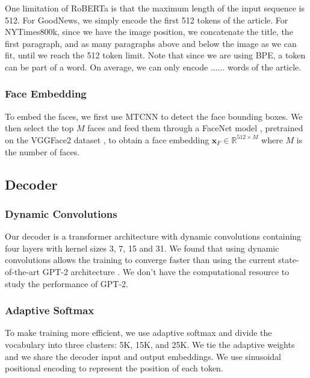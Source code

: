 \documentclass[10pt,twocolumn,letterpaper]{article}
\begin{document}
One limitation of RoBERTa is that the maximum length of the input sequence is
512. For GoodNews, we simply encode the first 512 tokens of the article. For
NYTimes800k, since we have the image position, we concatenate the title, the
first paragraph, and as many paragraphs above and below the image as we can
fit, until we reach the 512 token limit. Note that since we are using BPE, a
token can be part of a word. On average, we can only encode ...... words of
the article.


\subsubsection{Face Embedding}

To embed the faces, we first use MTCNN \cite{Zhang2016JointFD} to detect the
face bounding boxes. We then select the top $M$ faces and feed them through a
FaceNet model \cite{Schroff2015FaceNetAU}, pretrained on the VGGFace2 dataset
\cite{Cao2017VGGFace2AD}, to obtain a face embedding $\bm{x}_F \in
\mathbb{R}^{512 \times M}$ where $M$ is the number of faces.

\subsection{Decoder}

\subsubsection{Dynamic Convolutions}

Our decoder is a transformer architecture with dynamic convolutions
\cite{Wu2018PayLA} containing four layers with kernel sizes 3, 7, 15 and 31. We
found that using dynamic convolutions allows the training to converge faster
than using the current state-of-the-art GPT-2 architecture
\cite{Radford2019LanguageMA}. We don't have the computational resource to study
the performance of GPT-2.

\subsubsection{Adaptive Softmax}

To make training more efficient, we use adaptive softmax
\cite{Grave2016EfficientSA} and divide the vocabulary into three clusters: 5K,
15K, and 25K. We tie the adaptive weights and we share the decoder input and
output embeddings. We use sinusoidal positional encoding
\cite{Vaswani2017AttentionIA} to represent the position of each token.
\end{document}

